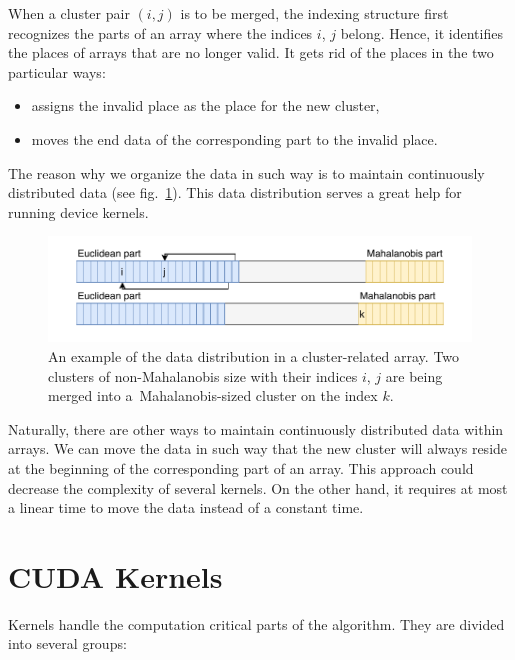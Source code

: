 When a cluster pair $(i,j)$ is to be merged, the indexing structure first recognizes the parts of an array where the indices $i$, $j$ belong. Hence, it identifies the places of arrays that are no longer valid. It gets rid of the places in the two particular ways:
\begin{itemize}
	\item assigns the invalid place as the place for the new cluster,
	\item moves the end data of the corresponding part to the invalid place.
\end{itemize}
The reason why we organize the data in such way is to maintain continuously distributed data (see fig.~\ref{fig03:data_order}). This data distribution serves a great help for running device kernels.

\begin{figure}\centering
	\includegraphics[width=\textwidth]{img/data}
	\caption{An example of the data distribution in a cluster-related array. Two clusters of non-Mahalanobis size with their indices $i$, $j$ are being merged into a~Mahalanobis-sized cluster on the index $k$.}
	\label{fig03:data_order}
\end{figure}

\begin{rem}
	Naturally, there are other ways to maintain continuously distributed data within arrays. We can move the data in such way that the new cluster will always reside at the beginning of the corresponding part of an array. This approach could decrease the complexity of several kernels. On the other hand, it requires at most a linear time to move the data instead of a constant time.
\end{rem}

\section{CUDA Kernels}

Kernels handle the computation critical parts of the algorithm. They are divided into several groups:

